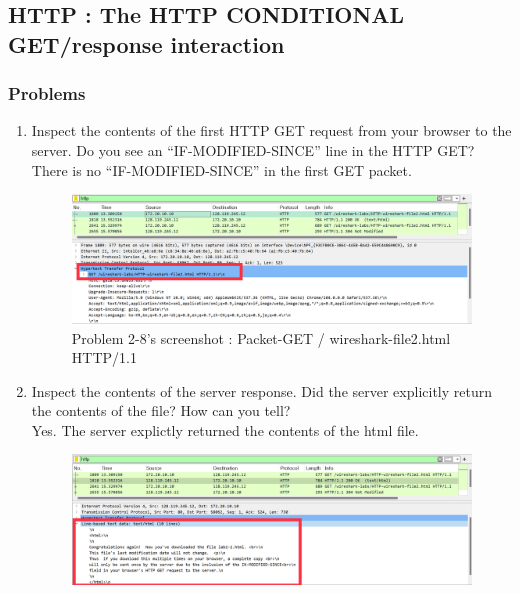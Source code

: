 \subsection{HTTP : The HTTP CONDITIONAL GET/response interaction}
    \subsubsection*{Problems}
    \begin{enumerate}[label=\bfseries Problem \arabic*:,leftmargin=*,labelindent=1em]\addtocounter{enumi}{7}
        \item Inspect the contents of the first HTTP GET request from your browser to the server.
        Do you see an “IF-MODIFIED-SINCE” line in the HTTP GET? \\[0.2mm]
            \soln There is no “IF-MODIFIED-SINCE” in the first GET packet.
            \begin{figure}[!h]\centering
        		\includegraphics[width=.78\textwidth]{image/result_week01/Q2-8.png}
        		\caption{\footnotesize Problem 2-8's screenshot : Packet-GET / wireshark-file2.html HTTP/1.1}
        		\vspace{-10pt}
            \end{figure}    
        \item Inspect the contents of the server response. Did the server explicitly return 
        the contents of the file? How can you tell? \\[0.2mm]
            \soln Yes. The server explictly returned the contents of the html file.
            \begin{figure}[!h]\centering
        		\includegraphics[width=.79\textwidth]{image/result_week01/Q2-9.png}

\end{figure}
\end{enumerate}
